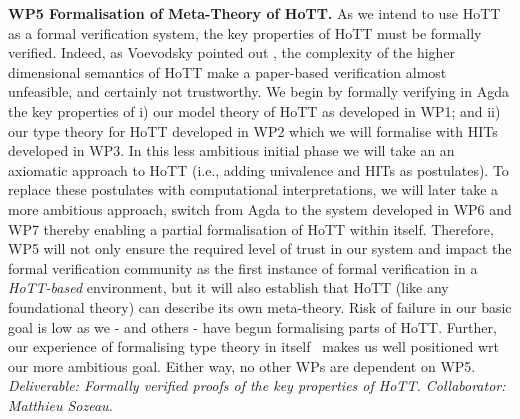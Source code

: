 \documentclass[a4paper,11pt]{article}
\newcommand{\eg}{{e.g.}\ }
\begin{document}
{\bf WP5 Formalisation of Meta-Theory of HoTT.}  As we intend to use
HoTT as a formal verification system, the key properties of HoTT must
be formally verified. Indeed, as Voevodsky pointed out
\cite{voevodsky-ias14}, the complexity of the higher dimensional
semantics of HoTT make a paper-based verification almost unfeasible,
and certainly not trustworthy. We begin by formally verifying in Agda
the key properties of i) our model theory of HoTT as developed in WP1; and
ii) our type theory for HoTT developed in WP2 which we will
formalise with HITs developed in WP3.  In this less ambitious initial
phase we will take an an axiomatic approach to HoTT (i.e., adding
univalence and HITs as postulates). To replace these postulates with
computational interpretations, we will later take a more ambitious
approach, switch from Agda to the system developed in WP6 and WP7
thereby enabling a partial formalisation of HoTT within itself.
Therefore, WP5 will not only ensure the required level of trust in our
system and impact the formal verification community as the first
instance of formal verification in a {\em HoTT-based} environment, but
it will also establish that HoTT (like any foundational theory) can
describe its own meta-theory. Risk of failure in our basic goal is low
as we - and others - have begun formalising parts of HoTT. Further, our
experience of formalising type theory in itself~\cite{} makes us well
positioned wrt our more ambitious goal. Either way, no other WPs are
dependent on WP5. {\em Deliverable: Formally verified proofs of the
key properties of HoTT.  Collaborator: Matthieu Sozeau.  }
\end{document}
